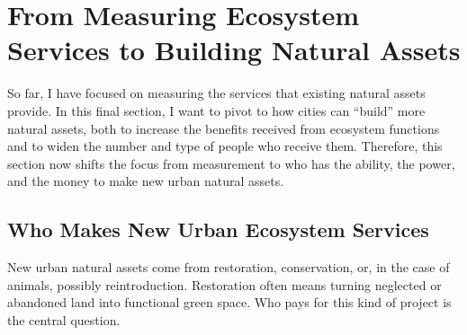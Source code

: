 \documentclass[12pt]{article}
\begin{document}
\section{From Measuring Ecosystem Services to Building Natural Assets}\label{sec:building}

So far, I have focused on measuring the services that existing natural assets provide. In this final section, I want to pivot to how cities can ``build'' more natural assets, both to increase the benefits received from ecosystem functions and to widen the number and type of people who receive them. Therefore, this section now shifts the focus from measurement to who has the ability, the power, and the money to make new urban natural assets.

\subsection{Who Makes New Urban Ecosystem Services}\label{sec:whobuilds}

New urban natural assets come from restoration, conservation, or, in the case of animals, possibly reintroduction. Restoration often means turning neglected or abandoned land into functional green space. Who pays for this kind of project is the central question. 
\end{document}
